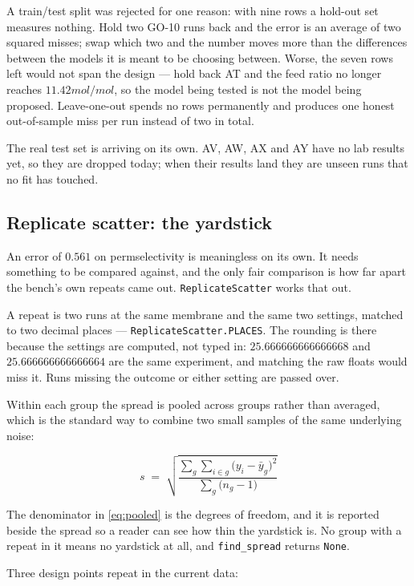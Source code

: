 A train/test split was rejected for one reason: with nine rows a hold-out set measures nothing.
Hold two GO-10 runs back and the error is an average of two squared misses; swap which two and
the number moves more than the differences between the models it is meant to be choosing
between. Worse, the seven rows left would not span the design --- hold back AT and the feed
ratio no longer reaches $11.42\unit{mol/mol}$, so the model being tested is not the model being
proposed. Leave-one-out spends no rows permanently and produces one honest out-of-sample miss
per run instead of two in total.

The real test set is arriving on its own. AV, AW, AX and AY have no lab results yet, so they are
dropped today; when their results land they are unseen runs that no fit has touched.

\subsection{Replicate scatter: the yardstick}

An error of $0.561$ on permselectivity is meaningless on its own. It needs something to be
compared against, and the only fair comparison is how far apart the bench's own repeats came
out. \texttt{ReplicateScatter} works that out.

A repeat is two runs at the same membrane and the same two settings, matched to two decimal
places --- \texttt{ReplicateScatter.PLACES}. The rounding is there because the settings are
computed, not typed in: $25.666666666666668$ and $25.666666666666664$ are the same experiment,
and matching the raw floats would miss it. Runs missing the outcome or either setting are passed
over.

Within each group the spread is pooled across groups rather than averaged, which is the standard
way to combine two small samples of the same underlying noise:

\begin{equation}
  \label{eq:pooled}
  s \;=\; \sqrt{\frac{\sum_{g}\sum_{i \in g}\bigl(y_i - \bar{y}_g\bigr)^2}
                     {\sum_{g}\bigl(n_g - 1\bigr)}}
\end{equation}

The denominator in \eqref{eq:pooled} is the degrees of freedom, and it is reported beside the
spread so a reader can see how thin the yardstick is. No group with a repeat in it means no
yardstick at all, and \texttt{find\_spread} returns \texttt{None}.

Three design points repeat in the current data:

